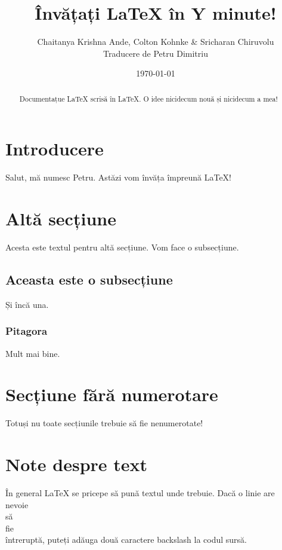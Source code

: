 \documentclass[12pt]{article}
\author{Chaitanya Krishna Ande, Colton Kohnke \& Sricharan Chiruvolu \\ Traducere de Petru Dimitriu}
\date{\today}
\title{Învățați LaTeX în Y minute!}
\begin{document}
\maketitle

\begin{abstract}
 Documentațue LaTeX scrisă în LaTeX. O idee nicidecum nouă și nicidecum a mea!
\end{abstract}

\section{Introducere}
Salut, mă numesc Petru. Astăzi vom învăța împreună LaTeX!

\section{Altă secțiune}
Acesta este textul pentru altă secțiune. Vom face o subsecțiune.

\subsection{Aceasta este o subsecțiune}
Și încă una.

\subsubsection{Pitagora}
Mult mai bine.
\label{subsec:pitagora}

\section*{Secțiune fără numerotare}
Totuși nu toate secțiunile trebuie să fie nenumerotate!

\section{Note despre text}
În general LaTeX se pricepe să pună textul unde trebuie. Dacă o linie are \\
nevoie \\ să \\ fie \\ întreruptă, puteți adăuga două caractere backslash
la codul sursă.
\end{document}
